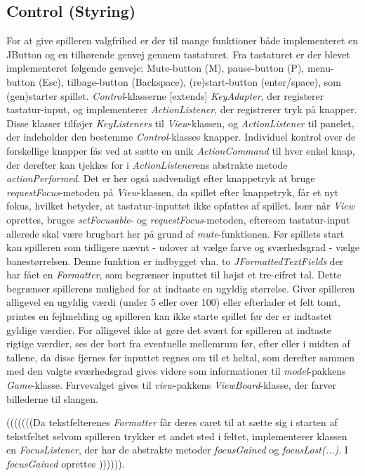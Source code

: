 \documentclass{report}
\begin{document}
\subsection{Control (Styring)}
For at give spilleren valgfrihed er der til mange funktioner både implementeret en JButton og en tilhørende genvej gennem tastaturet. Fra tastaturet er der blevet implementeret følgende genveje: Mute-button (M), pause-button (P), menu-button (Esc), tilbage-button (Backspace), (re)start-button (enter/space), som (gen)starter spillet. \textit{Control}-klasserne [extends] \textit{KeyAdapter}, der registerer tastatur-input, og implementerer \textit{ActionListener}, der registrerer tryk på knapper. Disse klasser tilføjer \textit{KeyListeners} til \textit{View}-klassen, og \textit{ActionListener} til panelet, der indeholder den bestemme \textit{Control}-klasses knapper. Individuel kontrol over de forskellige knapper fås ved at sætte en unik \textit{ActionCommand} til hver enkel knap, der derefter kan tjekkes for i \textit{ActionListener}ens abstrakte metode \textit{actionPerformed}. Det er her også nødvendigt efter knappetryk at bruge \textit{requestFocus}-metoden på \textit{View}-klassen, da spillet efter knappetryk, får et nyt fokus, hvilket betyder, at tastatur-inputtet ikke opfattes af spillet.
Især når \textit{View} oprettes, bruges \textit{setFocusable}- og \textit{requestFocus}-metoden, eftersom tastatur-input allerede skal være brugbart her på grund af \textit{mute}-funktionen.
Før spillets start kan spilleren som tidligere nævnt - udover at vælge farve og sværhedsgrad - vælge banestørrelsen. Denne funktion er indbygget vha. to \textit{JFormattedTextFields} der har fået en \textit{Formatter}, som begrænser inputtet til højst et tre-cifret tal. Dette begrænser spillerens mulighed for at indtaste en ugyldig størrelse. Giver spilleren alligevel en ugyldig værdi (under 5 eller over 100) eller efterlader et felt tomt, printes en fejlmelding og spilleren kan ikke starte spillet før der er indtastet gyldige værdier. For alligevel ikke at gøre det svært for spilleren at indtaste rigtige værdier, ses der bort fra eventuelle mellemrum før, efter eller i midten af tallene, da disse fjernes før inputtet regnes om til et heltal, som derefter sammen med den valgte sværhedsgrad gives videre som informationer til \textit{model}-pakkens \textit{Game}-klasse. Farvevalget gives til \textit{view}-pakkens \textit{ViewBoard}-klasse, der farver billederne til slangen.

(((((((Da tekstfelterenes \textit{Formatter} får deres caret til at sætte sig i starten af tekstfeltet selvom spilleren trykker et andet sted i feltet, implementerer klassen en \textit{FocusListener}, der har de abstrakte metoder \textit{focusGained} og \textit{focusLost(...)}. I \textit{focusGained} oprettes )))))).
\end{document}
